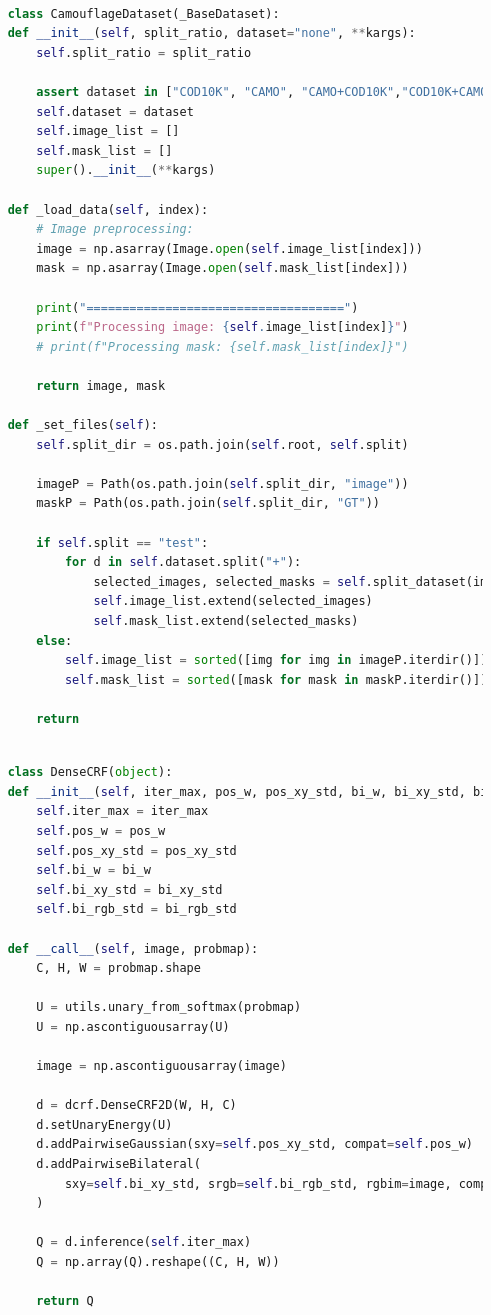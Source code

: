 \documentclass[a4paper,12pt]{ctexart}
\begin{document}
\begin{lstlisting}[language=Python]

    class CamouflageDataset(_BaseDataset):
    def __init__(self, split_ratio, dataset="none", **kargs):
        self.split_ratio = split_ratio
        
        assert dataset in ["COD10K", "CAMO", "CAMO+COD10K","COD10K+CAMO"], "Dataset not found"
        self.dataset = dataset
        self.image_list = []
        self.mask_list = []
        super().__init__(**kargs)

    def _load_data(self, index):
        # Image preprocessing:
        image = np.asarray(Image.open(self.image_list[index]))
        mask = np.asarray(Image.open(self.mask_list[index]))
        
        print("====================================")
        print(f"Processing image: {self.image_list[index]}")
        # print(f"Processing mask: {self.mask_list[index]}")
        
        return image, mask
    
    def _set_files(self):
        self.split_dir = os.path.join(self.root, self.split)
        
        imageP = Path(os.path.join(self.split_dir, "image"))
        maskP = Path(os.path.join(self.split_dir, "GT"))
        
        if self.split == "test":
            for d in self.dataset.split("+"):
                selected_images, selected_masks = self.split_dataset(imageP, maskP, "camourflage" if d == "CAMO" else d)
                self.image_list.extend(selected_images)
                self.mask_list.extend(selected_masks)
        else:
            self.image_list = sorted([img for img in imageP.iterdir()])
            self.mask_list = sorted([mask for mask in maskP.iterdir()])

        return
\end{lstlisting}

\begin{lstlisting}[language=Python]

    class DenseCRF(object):
    def __init__(self, iter_max, pos_w, pos_xy_std, bi_w, bi_xy_std, bi_rgb_std):
        self.iter_max = iter_max
        self.pos_w = pos_w
        self.pos_xy_std = pos_xy_std
        self.bi_w = bi_w
        self.bi_xy_std = bi_xy_std
        self.bi_rgb_std = bi_rgb_std

    def __call__(self, image, probmap):
        C, H, W = probmap.shape

        U = utils.unary_from_softmax(probmap)
        U = np.ascontiguousarray(U)

        image = np.ascontiguousarray(image)

        d = dcrf.DenseCRF2D(W, H, C)
        d.setUnaryEnergy(U)
        d.addPairwiseGaussian(sxy=self.pos_xy_std, compat=self.pos_w)
        d.addPairwiseBilateral(
            sxy=self.bi_xy_std, srgb=self.bi_rgb_std, rgbim=image, compat=self.bi_w
        )

        Q = d.inference(self.iter_max)
        Q = np.array(Q).reshape((C, H, W))

        return Q
\end{lstlisting}
\end{document}
